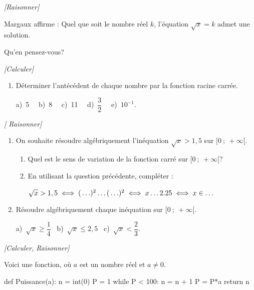 \exo \textit{[Raisonner]}

Margaux affirme : \og Quel que soit le nombre réel $k$, l'équation $\sqrt{x}=k$ admet une solution. \fg{} 

Qu'en pensez-vous?

\exo \textit{[Calculer]}

\begin{enumerate}
\item Déterminer l'antécédent de chaque nombre par la fonction racine carrée.

a)~5~~ \hspace{0.8cm}b)~8~~ \hspace{0.8cm}c)~11~~ \hspace{0.8cm}d)~$\dfrac{3}{2}$~~ \hspace{0.8cm}e)~$10^{-1}$.
\end{enumerate}

\exo \textit{[ Raisonner]}

\begin{enumerate}
\item On souhaite résoudre algébriquement l'inéquation $\sqrt{x} > 1,5$ sur $[0~;~+\infty[$.

\begin{enumerate}[label=\alph*)]
\item Quel est le sens de variation de la fonction carré sur $[0~;~+\infty[$?
\item En utilisant la question précédente, compléter :

$\sqrt{x} > 1,5 \iff ( \vphantom{\sqrt{x}} \ldots)^2 \ldots (\vphantom{1.5} \ldots)^2 \iff x \ldots 2.25 \iff x \in \ldots $

\end{enumerate}
\item Résoudre algébriquement chaque inéquation sur $[0~;~+\infty[$.

 a)~$\sqrt{x} \geqslant \dfrac{1}{4}$~\hspace{0.8cm} b)~$\sqrt{x} \leqslant 2,5$~\hspace{0.8cm} c)~$\sqrt{x} < \dfrac{2}{3}$.
\end{enumerate}



\exo \textit{ [Calculer, Raisonner]}

\bigskip

Voici une fonction, où $a$ est un nombre réel et $a \neq 0$.

\bigskip

\begin{center}
\begin{minipage}{0.46\linewidth}
\begin{pythoncodenumligne}
def Puissance(a):
    n = int(0)
    P = 1
    while P < 100:
        n = n + 1
        P = P*a
    return n
\end{pythoncodenumligne}
\end{minipage}
\end{center}

